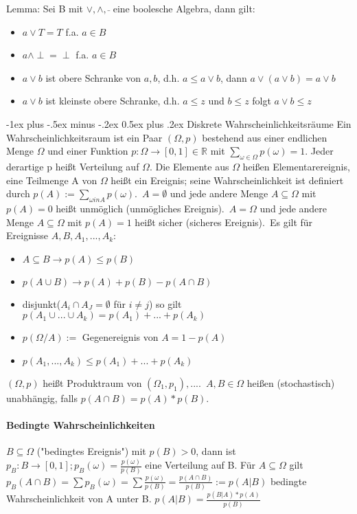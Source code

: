 \documentclass[10pt,landscape]{article}
\makeatletter
\renewcommand{\section}{\@startsection{section}{1}{0mm}%
                                {-1ex plus -.5ex minus -.2ex}%
                                {0.5ex plus .2ex}%
                                {\normalfont\large\bfseries}}
\makeatother
\begin{document}
\begin{multicols}{3}
Lemma: Sei B mit $\vee, \wedge, \bar{}$ eine boolesche Algebra, dann gilt:
\begin{itemize}
    \item $a\vee T = T$ f.a. $a\in B$
    \item $a\wedge \perp = \perp$ f.a. $a\in B$
    \item $a\vee b$ ist obere Schranke von ${a,b}$, d.h. $a\leq a\vee b$, dann $a\vee(a\vee b)=a\vee b$
    \item $a\vee b$ ist kleinste obere Schranke, d.h. $a\leq z$ und $b\leq z$ folgt $a\vee b \leq z$
\end{itemize}


\section{Diskrete Wahrscheinlichkeitsräume}
Ein Wahrscheinlichkeitsraum ist ein Paar $(\Omega, p)$ bestehend aus einer endlichen Menge $\Omega$ und einer Funktion $p:\Omega \rightarrow [0,1]\in \mathbb{R}$ mit $\sum_{\omega \in \Omega} p(\omega)=1$. Jeder derartige p heißt Verteilung auf $\Omega$. Die Elemente aus $\Omega$ heißen Elementarereignis, eine Teilmenge A von $\Omega$ heißt ein Ereignis; seine Wahrscheinlichkeit ist definiert durch $p(A):=\sum_{\omega in A} p(\omega)$.\
$A=\emptyset$ und jede andere Menge $A\subseteq \Omega$ mit $p(A)=0$ heißt unmöglich (unmögliches Ereignis).\
$A=\Omega$ und jede andere Menge $A\subseteq \Omega$ mit $p(A)=1$ heißt sicher (sicheres Ereignis).\
Es gilt für Ereignisse $A,B,A_1,...,A_k$:
\begin{itemize}
    \item $A\subseteq B \rightarrow p(A)\leq p(B)$
    \item $p(A\cup B) \rightarrow p(A)+p(B)-p(A\cap B)$
    \item disjunkt($A_i \cap A_J=\emptyset$ für $i\not =j$) so gilt $p(A_1 \cup ... \cup A_k)= p(A_1)+...+p(A_k)$
    \item $p(\Omega / A):=$ Gegenereignis von $A=1-p(A)$
    \item $p(A_1,...,A_k) \leq p(A_1)+...+p(A_k)$
\end{itemize}
$(\Omega, p)$ heißt Produktraum von $(\Omega_1, p_1),...$.\
$A,B\in \Omega$ heißen (stochastisch) unabhängig, falls $p(A\cap B) = p(A)*p(B)$.

\paragraph{Bedingte Wahrscheinlichkeiten}
$B\subseteq \Omega$ ("bedingtes Ereignis") mit $p(B)>0$, dann ist $p_B:B\rightarrow [0,1]; p_B(\omega)=\frac{p(\omega)}{p(B)}$ eine Verteilung auf B. Für $A\subseteq \Omega$ gilt $p_B(A\cap B)=\sum p_B(\omega)=\sum\frac{p(\omega)}{p(B)}= \frac{p(A\cap B)}{p(B)}:= p(A|B)$ bedingte Wahrscheinlichkeit von A unter B. $p(A|B)=\frac{p(B|A)*p(A)}{p(B)}$\



\end{multicols}
\end{document}
